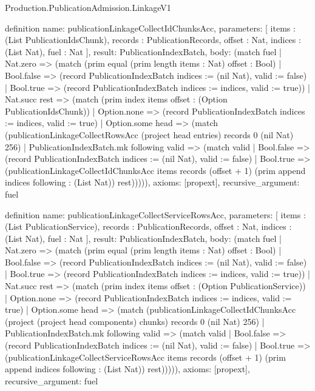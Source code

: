\begin{lexlean}{Production.PublicationAdmission.LinkageV1}
\begin{semanticmodule}
definition{
  name: publicationLinkageCollectIdChunksAcc,
  parameters: [
    items : (List PublicationIdsChunk),
    records : PublicationRecords,
    offset : Nat,
    indices : (List Nat),
    fuel : Nat
  ],
  result: PublicationIndexBatch,
  body: (match fuel
    | Nat.zero => (match (prim equal (prim length items : Nat) offset : Bool)
      | Bool.false => (record PublicationIndexBatch {indices := (nil Nat), valid := false})
      | Bool.true => (record PublicationIndexBatch {indices := indices, valid := true}))
    | Nat.succ rest => (match (prim index items offset : (Option PublicationIdsChunk))
      | Option.none => (record PublicationIndexBatch {indices := indices, valid := true})
      | Option.some head => (match (publicationLinkageCollectRowsAcc (project head entries) records 0 (nil Nat) 256)
        | PublicationIndexBatch.mk following valid => (match valid
          | Bool.false => (record PublicationIndexBatch {indices := (nil Nat), valid := false})
          | Bool.true => (publicationLinkageCollectIdChunksAcc items records (offset + 1) (prim append indices following : (List Nat)) rest))))),
  axioms: [propext],
  recursive_argument: fuel
}

definition{
  name: publicationLinkageCollectServiceRowsAcc,
  parameters: [
    items : (List PublicationService),
    records : PublicationRecords,
    offset : Nat,
    indices : (List Nat),
    fuel : Nat
  ],
  result: PublicationIndexBatch,
  body: (match fuel
    | Nat.zero => (match (prim equal (prim length items : Nat) offset : Bool)
      | Bool.false => (record PublicationIndexBatch {indices := (nil Nat), valid := false})
      | Bool.true => (record PublicationIndexBatch {indices := indices, valid := true}))
    | Nat.succ rest => (match (prim index items offset : (Option PublicationService))
      | Option.none => (record PublicationIndexBatch {indices := indices, valid := true})
      | Option.some head => (match (publicationLinkageCollectIdChunksAcc (project (project head components) chunks) records 0 (nil Nat) 256)
        | PublicationIndexBatch.mk following valid => (match valid
          | Bool.false => (record PublicationIndexBatch {indices := (nil Nat), valid := false})
          | Bool.true => (publicationLinkageCollectServiceRowsAcc items records (offset + 1) (prim append indices following : (List Nat)) rest))))),
  axioms: [propext],
  recursive_argument: fuel
}


\end{semanticmodule}
\end{lexlean}
